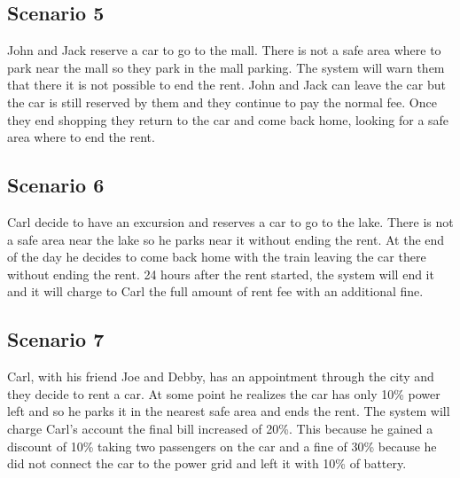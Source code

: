 \subsection*{Scenario 5}
John and Jack reserve a car to go to the mall. There is not a safe area where to park near the mall so they park in the mall parking. The system will warn them that there it is not possible to end the rent. John and Jack can leave the car but the car is still reserved by them and they continue to pay the normal fee. Once they end shopping they return to the car and come back home, looking for a safe area where to end the rent.
\subsection*{Scenario 6}
Carl decide to have an excursion and reserves a car to go to the lake. There is not a safe area near the lake so he parks near it without ending the rent. At the end of the day he decides to come back home with the train leaving the car there without ending the rent. 24 hours after the rent started, the system will end it and it will charge to Carl the full amount of rent fee with an additional fine.
\subsection*{Scenario 7}
Carl, with his friend Joe and Debby, has an appointment through the city and they decide to rent a car. At some point he realizes the car has only 10\% power left and so he parks it in the nearest safe area and ends the rent. The system will charge Carl's account the final bill increased of 20\%. This because he gained a discount of 10\% taking two passengers on the car and a fine of 30\% because he did not connect the car to the power grid and left it with 10\% of battery.